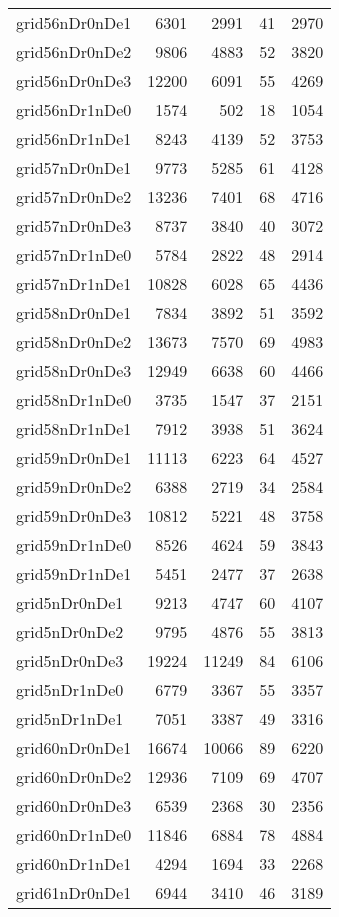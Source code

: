 \begin{longtable}{lrrrr}
grid56nDr0nDe1 & 6301 & 2991 & 41 & 2970 \\
grid56nDr0nDe2 & 9806 & 4883 & 52 & 3820 \\
grid56nDr0nDe3 & 12200 & 6091 & 55 & 4269 \\
grid56nDr1nDe0 & 1574 & 502 & 18 & 1054 \\
grid56nDr1nDe1 & 8243 & 4139 & 52 & 3753 \\
grid57nDr0nDe1 & 9773 & 5285 & 61 & 4128 \\
grid57nDr0nDe2 & 13236 & 7401 & 68 & 4716 \\
grid57nDr0nDe3 & 8737 & 3840 & 40 & 3072 \\
grid57nDr1nDe0 & 5784 & 2822 & 48 & 2914 \\
grid57nDr1nDe1 & 10828 & 6028 & 65 & 4436 \\
grid58nDr0nDe1 & 7834 & 3892 & 51 & 3592 \\
grid58nDr0nDe2 & 13673 & 7570 & 69 & 4983 \\
grid58nDr0nDe3 & 12949 & 6638 & 60 & 4466 \\
grid58nDr1nDe0 & 3735 & 1547 & 37 & 2151 \\
grid58nDr1nDe1 & 7912 & 3938 & 51 & 3624 \\
grid59nDr0nDe1 & 11113 & 6223 & 64 & 4527 \\
grid59nDr0nDe2 & 6388 & 2719 & 34 & 2584 \\
grid59nDr0nDe3 & 10812 & 5221 & 48 & 3758 \\
grid59nDr1nDe0 & 8526 & 4624 & 59 & 3843 \\
grid59nDr1nDe1 & 5451 & 2477 & 37 & 2638 \\
grid5nDr0nDe1 & 9213 & 4747 & 60 & 4107 \\
grid5nDr0nDe2 & 9795 & 4876 & 55 & 3813 \\
grid5nDr0nDe3 & 19224 & 11249 & 84 & 6106 \\
grid5nDr1nDe0 & 6779 & 3367 & 55 & 3357 \\
grid5nDr1nDe1 & 7051 & 3387 & 49 & 3316 \\
grid60nDr0nDe1 & 16674 & 10066 & 89 & 6220 \\
grid60nDr0nDe2 & 12936 & 7109 & 69 & 4707 \\
grid60nDr0nDe3 & 6539 & 2368 & 30 & 2356 \\
grid60nDr1nDe0 & 11846 & 6884 & 78 & 4884 \\
grid60nDr1nDe1 & 4294 & 1694 & 33 & 2268 \\
grid61nDr0nDe1 & 6944 & 3410 & 46 & 3189 \\

\end{longtable}
